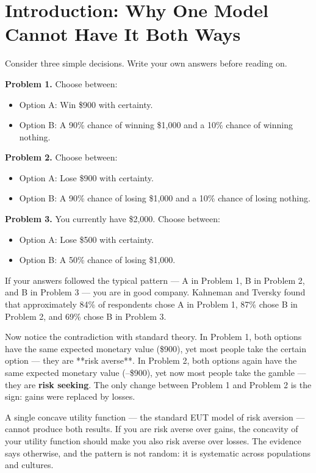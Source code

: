 \documentclass[12pt, letterpaper]{article}
\begin{document}
\medskip


\section*{Introduction: Why One Model Cannot Have It Both Ways}


Consider three simple decisions. Write your own answers before reading on.

\textbf{Problem 1.} Choose between:
\begin{itemize}
\item Option A: Win \$900 with certainty.
\item Option B: A 90\% chance of winning \$1,000 and a 10\% chance of winning nothing.
\end{itemize}

\textbf{Problem 2.} Choose between:
\begin{itemize}
\item Option A: Lose \$900 with certainty.
\item Option B: A 90\% chance of losing \$1,000 and a 10\% chance of losing nothing.
\end{itemize}

\textbf{Problem 3.} You currently have \$2,000. Choose between:
\begin{itemize}
\item Option A: Lose \$500 with certainty.
\item Option B: A 50\% chance of losing \$1,000.
\end{itemize}

If your answers followed the typical pattern --- A in Problem 1, B in Problem 2, and B in Problem 3 --- you are in good company. Kahneman and Tversky found that approximately 84\% of respondents chose A in Problem 1, 87\% chose B in Problem 2, and 69\% chose B in Problem 3.

Now notice the contradiction with standard theory. In Problem 1, both options have the same expected monetary value (\$900), yet most people take the certain option --- they are **risk averse**. In Problem 2, both options again have the same expected monetary value (--\$900), yet now most people take the gamble --- they are \textbf{risk seeking}. The only change between Problem 1 and Problem 2 is the sign: gains were replaced by losses.

A single concave utility function --- the standard EUT model of risk aversion --- cannot produce both results. If you are risk averse over gains, the concavity of your utility function should make you also risk averse over losses. The evidence says otherwise, and the pattern is not random: it is systematic across populations and cultures.
\end{document}
